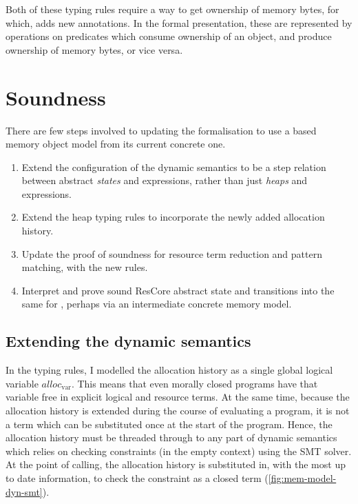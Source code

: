 Both of these typing rules require a way to get ownership of memory bytes, for
which,  adds new annotations.
In the formal presentation, these are represented by operations on predicates
which consume ownership of an object, and produce ownership of memory bytes, or
vice versa.

\section{Soundness}\label{sec:cn-vip-soundness}

There are few steps involved to updating the formalisation to use a 
based memory object model from its current concrete one.
\begin{enumerate}
    \item Extend the configuration of the dynamic semantics to be a step
        relation between abstract \emph{states} and expressions, rather than
        just \emph{heaps} and expressions.
    \item Extend the heap typing rules to incorporate the newly added
        allocation history.
    \item Update the proof of soundness for resource term reduction and pattern
        matching, with the new rules.
    \item Interpret and prove sound ResCore abstract state and transitions into
        the same for , perhaps via an intermediate concrete
        memory model.
\end{enumerate}

\subsection{Extending the dynamic semantics}

In the typing rules, I modelled the allocation history as a single global
logical variable $\mathit{alloc}_\mathrm{var}$. This means that even morally
closed programs have that variable free in explicit logical and resource terms.
At the same time, because the allocation history is extended during the course
of evaluating a  program, it is not a term which can be substituted
once at the start of the program. Hence, the allocation history must
be threaded through to any part of dynamic semantics which relies on checking
constraints (in the empty context) using the SMT solver. At the point of
calling, the allocation history is substituted in, with the most up to date
information, to check the constraint as a closed term (\cref{fig:mem-model-dyn-smt}).

